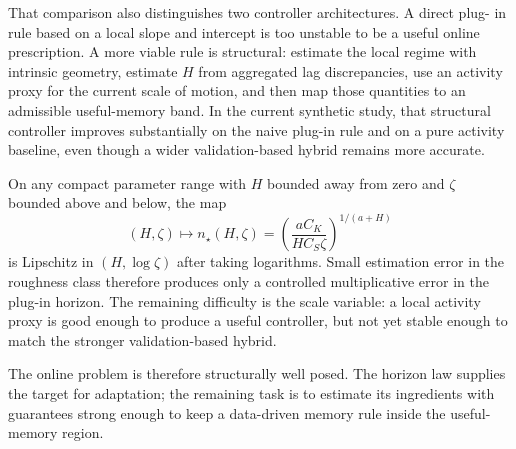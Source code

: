 That comparison also distinguishes two controller architectures. A direct plug-
in rule based on a local slope and intercept is too unstable to be a useful
online prescription. A more viable rule is structural: estimate the local regime
with intrinsic geometry, estimate $H$ from aggregated lag discrepancies, use an
activity proxy for the current scale of motion, and then map those quantities to
an admissible useful-memory band. In the current synthetic study, that
structural controller improves substantially on the naive plug-in rule and on a
pure activity baseline, even though a wider validation-based hybrid remains more
accurate.

On any compact parameter range with $H$ bounded away from zero and $\zeta$
bounded above and below, the map
\[
  (H,\zeta) \mapsto n_\star(H,\zeta)
  = \left(\frac{aC_K}{H C_S\zeta}\right)^{1/(a+H)}
\]
is Lipschitz in $(H,\log \zeta)$ after taking logarithms. Small estimation error
in the roughness class therefore produces only a controlled multiplicative error
in the plug-in horizon. The remaining difficulty is the scale variable: a local
activity proxy is good enough to produce a useful controller, but not yet stable
enough to match the stronger validation-based hybrid.

The online problem is therefore structurally well posed. The horizon law
supplies the target for adaptation; the remaining task is to estimate its
ingredients with guarantees strong enough to keep a data-driven memory rule
inside the useful-memory region.

